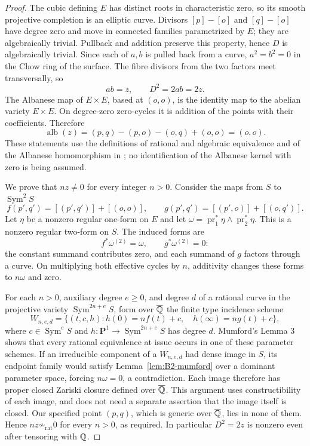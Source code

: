 \begin{proof}
The cubic defining $E$ has distinct roots in characteristic zero, so
its smooth projective completion is an elliptic curve. Divisors
$[p]-[o]$ and $[q]-[o]$ have degree zero and move in connected families
parametrized by $E$; they are algebraically trivial. Pullback and addition
preserve this property, hence $D$ is algebraically trivial.
Since each of $a,b$ is pulled back from a curve,
$a^2=b^2=0$ in the Chow ring of the surface. The fibre divisors from the
two factors meet transversally, so
\[
 ab=z,\qquad D^2=2ab=2z.
\]
The Albanese map of $E\times E$, based at $(o,o)$, is the identity map
to the abelian variety $E\times E$. On degree-zero zero-cycles it is
addition of the points with their coefficients. Therefore
\[
 \operatorname{alb}(z)=(p,q)-(p,o)-(o,q)+(o,o)=(o,o).
\]
These statements use the definitions of rational and algebraic
equivalence and of the Albanese homomorphism in
\cite[Lecture 0, pp.~3--5, and Lecture 1, Proposition 1.1(ii)--(iii),
pp.~9--10]{BBloch1980}; no
identification of the Albanese kernel with zero is being assumed.

We prove that $nz\ne0$ for every integer $n>0$. Consider the maps
from $S$ to $\operatorname{Sym}^2 S$
\[
 f(p',q')=[(p',q')]+[(o,o)],\qquad
 g(p',q')=[(p',o)]+[(o,q')].
\]
Let $\eta$ be a nonzero regular one-form on $E$ and let
$\omega=\operatorname{pr}_1^*\eta\wedge\operatorname{pr}_2^*\eta$.
This is a nonzero regular two-form on $S$.
The induced forms are
\[
 f^*\omega^{(2)}=\omega,\qquad g^*\omega^{(2)}=0:
\]
the constant summand contributes zero, and each summand of $g$ factors
through a curve. On multiplying both effective cycles by $n$,
additivity changes these forms to $n\omega$ and zero.

For each $n>0$, auxiliary degree $e\geq0$, and degree $d$ of a
rational curve in the projective variety $\operatorname{Sym}^{2n+e}S$,
form over $\overline{{\mathbb{Q}}}$ the finite type incidence scheme
\[
 W_{n,e,d}=\{(t,c,h):h(0)=nf(t)+c,\quad h(\infty)=ng(t)+c\},
\]
where $c\in\operatorname{Sym}^eS$ and $h:\mathbf P^1\to
\operatorname{Sym}^{2n+e}S$ has degree $d$.
Mumford's Lemma 3 shows that every rational equivalence at issue
occurs in one of these parameter schemes. If an irreducible component
of a $W_{n,e,d}$ had dense image in $S$, its endpoint family would
satisfy Lemma~\ref{lem:B2-mumford} over a dominant parameter space,
forcing $n\omega=0$, a contradiction. Each image therefore has proper
closed Zariski closure defined over $\overline{{\mathbb{Q}}}$. This argument uses
constructibility of each image, and does not need a separate assertion
that the image itself is closed. Our specified point $(p,q)$,
which is generic over $\overline{{\mathbb{Q}}}$, lies in none of them. Hence
$nz\not\sim_{\mathrm{rat}}0$ for every $n>0$, as required.
In particular $D^2=2z$ is nonzero even after tensoring with ${\mathbb{Q}}$.
\end{proof}

